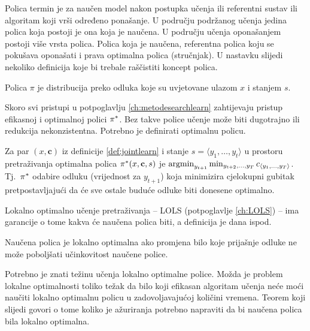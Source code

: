 Polica  termin je za naučen model nakon postupka učenja ili
referentni sustav ili algoritam koji vrši određeno ponašanje. U području
podržanog učenja jedina polica koja postoji je ona koja je naučena. U području
učenja oponašanjem  postoji više vrsta polica. Polica
koja je naučena, referentna polica koju se pokušava oponašati i prava optimalna
polica (stručnjak). U nastavku slijedi nekoliko definicija koje bi trebale
raščistiti koncept polica.

\begin{definition}[Polica]

  Polica $\pi$ je distribucija preko odluka koje su uvjetovane ulazom $x$ i
  stanjem $s$.

\end{definition}

\noindent
Skoro svi pristupi u potpoglavlju \ref{ch:metodesearchlearn} zahtijevaju pristup
efikasnoj i optimalnoj polici $\pi\ssymbol{1}$. Bez takve police učenje može
biti dugotrajno ili redukcija nekonzistentna. Potrebno je definirati optimalnu
policu.

\begin{definition}

  Za par $(x, \mathbf{c})$ iz definicije \ref{def:jointlearn} i stanje $s =
  \langle y_1, \ldots, y_t \rangle$ u prostoru pretraživanja optimalna polica
  $\pi\ssymbol{1}(x, \mathbf{c}, s)$ je $\operatorname*{argmin}_{y_{t+1}} \min_{y_{t+2},
  \ldots, y_T} c_{\langle y_1, \ldots, y_T \rangle}$. Tj.~$\pi\ssymbol{1}$
  odabire odluku (vrijednost za $y_{t+1}$) koja minimizira cjelokupni gubitak
  pretpostavljajući da će sve ostale buduće odluke biti donesene optimalno.

\end{definition}

\noindent
Lokalno optimalno učenje pretraživanja -- \textsc{LOLS} (potpoglavlje
\ref{ch:LOLS}) --  ima garancije o tome kakva će naučena polica biti, a
definicija je dana ispod.

\begin{definition}

  Naučena polica je lokalno optimalna ako promjena bilo koje prijašnje odluke ne
  može poboljšati učinkovitost naučene police.

\end{definition}

\noindent
Potrebno je znati težinu učenja lokalno optimalne police. Možda je problem
lokalne optimalnosti toliko težak da bilo koji efikasan algoritam učenja neće
moći naučiti lokalno optimalnu policu u zadovoljavajućoj količini vremena.
Teorem koji slijedi govori o tome koliko je ažuriranja potrebno napraviti da bi
naučena polica bila lokalno optimalna.

